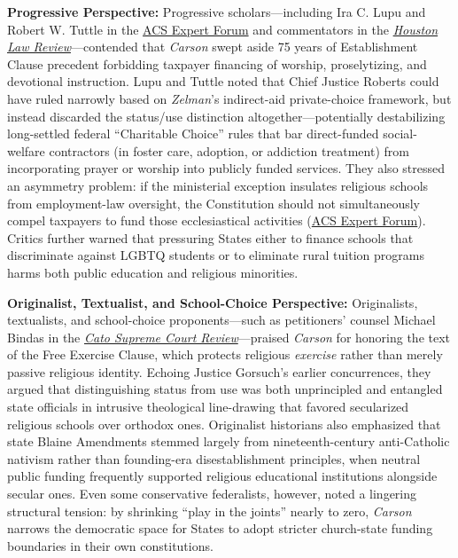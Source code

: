 \documentclass[12pt]{article}
\begin{document}
\textbf{Progressive Perspective:} Progressive scholars---including Ira C. Lupu and Robert W. Tuttle in the \href{https://www.acslaw.org/expertforum/carson-v-makin-and-the-dwindling-twilight-of-the-establishment-clause/}{ACS Expert Forum} and commentators in the \href{https://houstonlawreview.org/article/92811-unprincipled}{\textit{Houston Law Review}}---contended that \textit{Carson} swept aside 75 years of Establishment Clause precedent forbidding taxpayer financing of worship, proselytizing, and devotional instruction. Lupu and Tuttle noted that Chief Justice Roberts could have ruled narrowly based on \textit{Zelman}'s indirect-aid private-choice framework, but instead discarded the status/use distinction altogether---potentially destabilizing long-settled federal ``Charitable Choice'' rules that bar direct-funded social-welfare contractors (in foster care, adoption, or addiction treatment) from incorporating prayer or worship into publicly funded services. They also stressed an asymmetry problem: if the ministerial exception insulates religious schools from employment-law oversight, the Constitution should not simultaneously compel taxpayers to fund those ecclesiastical activities (\href{https://www.acslaw.org/expertforum/carson-v-makin-and-the-dwindling-twilight-of-the-establishment-clause/}{ACS Expert Forum}). Critics further warned that pressuring States either to finance schools that discriminate against LGBTQ students or to eliminate rural tuition programs harms both public education and religious minorities.

\textbf{Originalist, Textualist, and School-Choice Perspective:} Originalists, textualists, and school-choice proponents---such as petitioners' counsel Michael Bindas in the \href{https://www.cato.org/supreme-court-review/2021-2022/use-nondistinction}{\textit{Cato Supreme Court Review}}---praised \textit{Carson} for honoring the text of the Free Exercise Clause, which protects religious \textit{exercise} rather than merely passive religious identity. Echoing Justice Gorsuch's earlier concurrences, they argued that distinguishing status from use was both unprincipled and entangled state officials in intrusive theological line-drawing that favored secularized religious schools over orthodox ones. Originalist historians also emphasized that state Blaine Amendments stemmed largely from nineteenth-century anti-Catholic nativism rather than founding-era disestablishment principles, when neutral public funding frequently supported religious educational institutions alongside secular ones. Even some conservative federalists, however, noted a lingering structural tension: by shrinking ``play in the joints'' nearly to zero, \textit{Carson} narrows the democratic space for States to adopt stricter church-state funding boundaries in their own constitutions.
\end{document}
